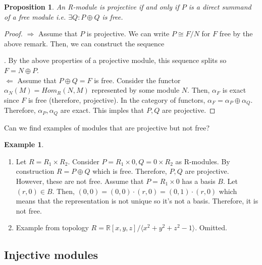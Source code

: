 \documentclass{article}
\newcommand\R{\ensuremath{\mathbb{R}}}
\theoremstyle{definition}
\newtheorem{eg}{Example}[subsection]
\theoremstyle{remark}
\theoremstyle{plain}
\newtheorem{prop}{Proposition}[subsection]
\begin{document}
\begin{prop}
    An R-module is projective if and only if \(P\) is a direct summand of a free module i.e. 
    \(\exists Q: P\oplus Q\) is free. 
\end{prop}
\begin{proof}
    \(\Rightarrow\) Assume that \(P\) is projective. We can write \(P \cong F/N\) for \(F\) free by the above remark. 
    Then, we can construct the sequence .
    By the above properties of a projective module, this sequence splits so \(F = N\oplus P\).\\
    \(\Leftarrow\) Assume that \(P\oplus Q = F\) is free. Consider the functor \(\alpha_N(M) = Hom_R(N,M)\) 
    represented by some module \(N\). Then, \(\alpha_F\) is exact since \(F\) is free (therefore, projective). 
    In the category of functors, \(\alpha_F  = \alpha_P \oplus \alpha_Q\). Therefore, \(\alpha_P, \alpha_Q\) are exact. 
    This imples that \(P, Q\) are projective.
\end{proof}

Can we find examples of modules that are projective but not free?
\begin{eg}
    \begin{enumerate}
        \item Let \(R = R_1 \times R_2\). Consider \(P = R_1 \times 0, Q = 0 \times R_2\) as R-modules. By construction
        \(R = P \oplus Q\) which is free. Therefore, \(P,Q\) are projective. However, these are not free. Assume that \(P = R_1 \times 0\)
        has a basis \(B\). Let \((r,0) \in B\). Then, \((0,0) = (0,0)\cdot(r,0) = (0,1)\cdot(r,0)\) which means that the representation is not unique
        so it's not a basis. Therefore, it is not free.
        \item Example from topology \(R = \R[x,y,z]/\langle x^2 + y^2 + z^2 -1 \rangle\). Omitted. 
    \end{enumerate}
\end{eg}

\subsection{Injective modules}
\end{document}
